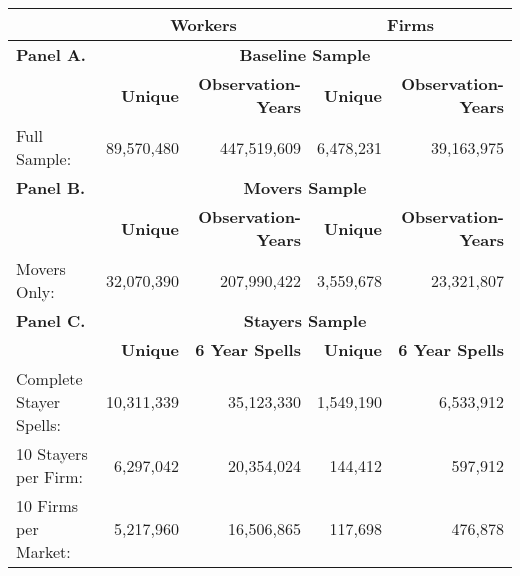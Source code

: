 \begin{tabular}{lrrrr}
\toprule 
\midrule 
 & \multicolumn{2}{c}{\textbf{Workers}} & \multicolumn{2}{c}{\textbf{Firms}} \\
\midrule 
\textbf{Panel A.} & \multicolumn{4}{c}{\textbf{Baseline Sample}} \\
 \cmidrule(lr){2-5} 
 & \textbf{Unique} & \textbf{Observation-Years} & \textbf{Unique} & \textbf{Observation-Years} \\
Full Sample: & 89,570,480 & 447,519,609 & 6,478,231 & 39,163,975 \\
\midrule 
\textbf{Panel B.} & \multicolumn{4}{c}{\textbf{Movers Sample}} \\
 \cmidrule(lr){2-5} 
 & \textbf{Unique} & \textbf{Observation-Years} & \textbf{Unique} & \textbf{Observation-Years} \\
Movers Only: & 32,070,390 & 207,990,422 & 3,559,678 & 23,321,807 \\
\midrule 
\textbf{Panel C.} & \multicolumn{4}{c}{\textbf{Stayers Sample}} \\
 \cmidrule(lr){2-5} 
 & \textbf{Unique} & \textbf{6 Year Spells} & \textbf{Unique} & \textbf{6 Year Spells} \\
Complete Stayer Spells: & 10,311,339 & 35,123,330 & 1,549,190 & 6,533,912 \\
10 Stayers per Firm: & 6,297,042 & 20,354,024 & 144,412 & 597,912 \\
10 Firms per Market: & 5,217,960 & 16,506,865 & 117,698 & 476,878 \\
\midrule 
\bottomrule 
\end{tabular}
